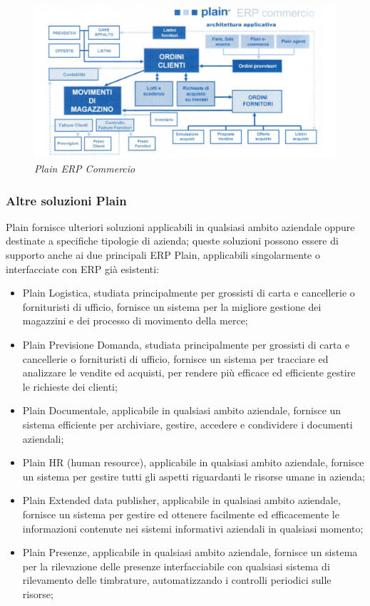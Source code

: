 \begin{itemize}
	\begin{figure}[ht]
		\centering
		\includegraphics[scale=0.35]{immagini/azienda/plain_erp_commercio}
		\caption{\textit{Plain ERP Commercio}}
	\end{figure}\FloatBarrier
	
\end{itemize}
\subsubsection{Altre soluzioni Plain}
Plain fornisce ulteriori soluzioni applicabili in qualsiasi ambito aziendale oppure destinate a specifiche tipologie di azienda; queste soluzioni possono essere di supporto anche ai due principali ERP Plain, applicabili singolarmente o interfacciate con ERP già esistenti:
\begin{itemize}
	\item Plain Logistica, studiata principalmente per grossisti di carta e cancellerie o fornituristi di ufficio, fornisce un sistema per la migliore gestione dei magazzini e dei processo di movimento della merce;
	\item Plain Previsione Domanda, studiata principalmente per grossisti di carta e cancellerie o fornituristi di ufficio, fornisce un sistema per tracciare ed analizzare le vendite ed acquisti, per rendere più efficace ed efficiente gestire le richieste dei clienti;
	\item Plain Documentale, applicabile in qualsiasi ambito aziendale, fornisce un sistema efficiente per archiviare, gestire, accedere e condividere i documenti aziendali;
	\item Plain HR (human resource), applicabile in qualsiasi ambito aziendale, fornisce un sistema per gestire tutti gli aspetti riguardanti le risorse umane in azienda;
	\item Plain Extended data publisher, applicabile in qualsiasi ambito aziendale, fornisce un sistema per gestire ed ottenere facilmente ed efficacemente le informazioni contenute nei sistemi informativi aziendali in qualsiasi momento;
	\item Plain Presenze, applicabile in qualsiasi ambito aziendale, fornisce un sistema per la rilevazione delle presenze interfacciabile con qualsiasi sistema di rilevamento delle timbrature, automatizzando i controlli periodici sulle risorse;
\end{itemize}
